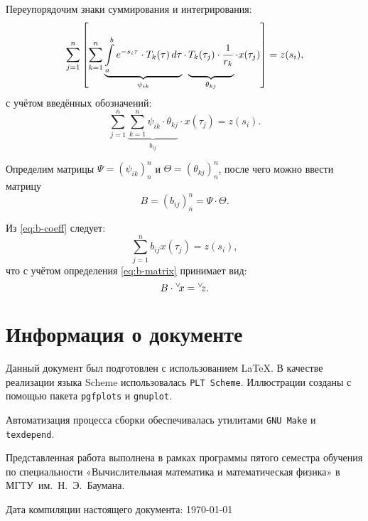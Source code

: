 \documentclass[11pt]{article}
\numberwithin{equation}{section}
\newcommand{\intl}{\int\limits}
\renewcommand{\vec}[1]{{}^{\vee}\negmedspace#1}
\newcommand{\program}[1]{{\tt #1}}
\newcommand{\name}{\textsc}
\newcommand{\mul}{\cdot}
\begin{document}
Переупорядочим знаки суммирования и интегрирования:
\begin{equation}
  \label{eq:psi-theta}
  \sum_{j=1}^n \left[
    \sum_{k=1}^n \underbrace{
      \intl_a^b e^{-s_i\tau}\mul T_k(\tau)\,d\tau}_{\psi_{ik}}
    \mul \underbrace{\vphantom{\intl_a^b} T_k(\tau_j) \mul \frac{1}{r_k}}_{\theta_{kj}}
  \mul x(\tau_j)\right] = z(s_i),
\end{equation}
с учётом введённых обозначений:
\begin{equation}
  \label{eq:b-coeff}
  \sum_{j=1}^n{ 
    \underbrace{\sum_{k=1}^n \psi_{ik} \mul \theta_{kj}}_{b_{ij}} \mul
    x(\tau_j)} = z(s_i).
\end{equation}

Определим матрицы $\Psi = (\psi_{ik})_n^n$ и $\Theta =
(\theta_{kj})_n^n$, после чего можно ввести матрицу 
\begin{equation}
  \label{eq:b-matrix}
  B = (b_{ij})_n^n = \Psi\mul\Theta.
\end{equation}

Из \eqref{eq:b-coeff} следует:
\begin{equation*}
  \sum_{j=1}^nb_{ij}x(\tau_j) = z(s_i),
\end{equation*}
что с учётом определения \eqref{eq:b-matrix} принимает вид:
\begin{equation}
  \label{eq:discrete}
  B\mul\vec{x}=\vec{z}.
\end{equation}

\clearpage
\section{Информация о документе}

Данный документ был подготовлен с использованием \LaTeX{}. В качестве
реализации языка Scheme использовалась \program{PLT Scheme}.
Иллюстрации созданы с помощью пакета \program{pgfplots} и
\program{gnuplot}.

Автоматизация процесса сборки обеспечивалась утилитами
\program{GNU Make} и \program{texdepend}.

Представленная работа выполнена в рамках программы пятого семестра
обучения по специальности «Вычислительная математика и математическая
физика» в МГТУ им. Н. Э. Баумана.

Дата компиляции настоящего документа: \today
\newcommand{\BibEmph}{\name}


\end{document}
